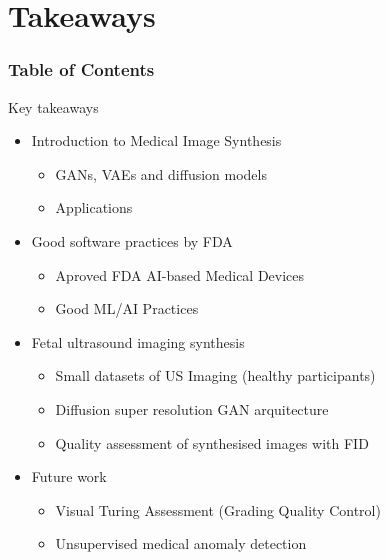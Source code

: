 \section{Takeaways}
\begin{frame}
  \frametitle{Table of Contents}
  \tableofcontents[currentsection]
\end{frame}

{


\begin{frame}{Key takeaways}
\begin{itemize}
\item Introduction to Medical Image Synthesis 
    \begin{itemize}
    \item GANs, VAEs and diffusion models
    \item Applications
    \end{itemize}

\item Good software practices by FDA
    \begin{itemize}
    \item Aproved FDA AI-based Medical Devices
    \item Good ML/AI Practices 
    \end{itemize}

\item Fetal ultrasound imaging synthesis 
    \begin{itemize}
    \item Small datasets of US Imaging (healthy participants)
    \item Diffusion super resolution GAN arquitecture
    \item Quality assessment of synthesised images with FID 
    \end{itemize}

\item Future work
    \begin{itemize}
    \item Visual Turing Assessment (Grading Quality Control)
    \item Unsupervised medical anomaly detection
    \end{itemize}

\end{itemize}

\end{frame}
}



